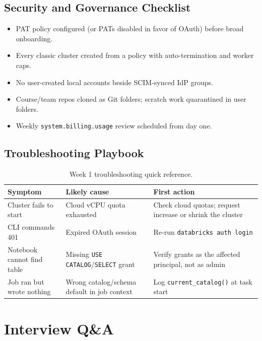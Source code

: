 \subsection{Security and Governance Checklist}
\begin{itemize}
    \item PAT policy configured (or PATs disabled in favor of OAuth) before broad onboarding.
    \item Every classic cluster created from a policy with auto-termination and worker caps.
    \item No user-created local accounts beside SCIM-synced IdP groups.
    \item Course/team repos cloned as Git folders; scratch work quarantined in user folders.
    \item Weekly \texttt{system.billing.usage} review scheduled from day one.
\end{itemize}

\subsection{Troubleshooting Playbook}
\begin{table}[H]
\centering
\small
\begin{tabular}{@{}p{3.6cm}p{4.2cm}p{4.8cm}@{}}
\toprule
\textbf{Symptom} & \textbf{Likely cause} & \textbf{First action} \\
\midrule
Cluster fails to start & Cloud vCPU quota exhausted & Check cloud quotas; request increase or shrink the cluster \\
CLI commands 401 & Expired OAuth session & Re-run \texttt{databricks auth login} \\
Notebook cannot find table & Missing \texttt{USE CATALOG}/\texttt{SELECT} grant & Verify grants as the affected principal, not as admin \\
Job ran but wrote nothing & Wrong catalog/schema default in job context & Log \texttt{current\_catalog()} at task start \\
\bottomrule
\end{tabular}
\caption{Week 1 troubleshooting quick reference.}
\label{tab:ch1-trouble}
\end{table}

\section{Interview Q\&A}
